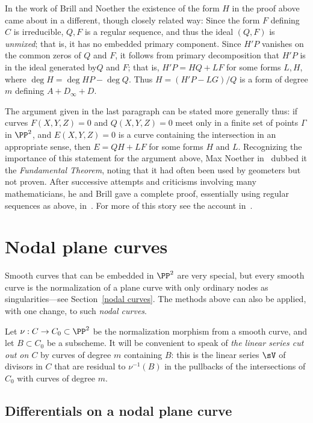 In the work of Brill and Noether the existence of the form $H$ in the proof above came about
in a different, though closely related way: Since the form  $F$ defining $C$ is irreducible, 
$Q,F$ is a regular sequence, and thus the ideal $(Q,F)$ is \emph{unmixed}; that is, it has no embedded primary component.
Since $H'P$ vanishes on the common zeros of $Q$ and $F$, it follows from
primary decomposition that $H'P$ is in the ideal generated by$Q$ and $F$; that is,
$H'P = HQ +LF$ for some
forms $L,H$, where $\deg H = \deg HP - \deg Q$. Thus $H = (H'P- LG)/Q$ is a form
of degree $m$ defining $A+D_\infty+D$.

The argument given in the last paragraph can be stated more generally thus:  if curves $F(X,Y,Z)=0$ and $Q(X,Y,Z)=0$ 
meet only in a finite set of points $\Gamma$ in $\PP^{2}$, and $E(X,Y,Z) = 0$ is a curve containing the intersection in an appropriate sense,
then $E = QH +LF$ for some forms $H$ and $L$. Recognizing the importance of this
statement for the argument above, Max Noether in~\cite{} dubbed it the \emph{Fundamental Theorem}, 
noting that it had often been used by geometers but not proven. After successive attempts and 
criticisms involving many mathematicians, he and Brill gave a complete proof, essentially using
regular sequences as above, in~\cite{****}. For more of this story see the account in~\cite{Eisenbud-Gray}.



\section{Nodal plane curves}\label{nodal curves section}

Smooth curves that can be embedded in $\PP^{2}$ are very special, but every smooth curve 
is the normalization of a plane curve with only ordinary nodes as singularities---see Section~\ref{nodal curves}.  The methods above can also be applied, with one change, to such \emph{nodal curves}.

Let $\nu: C\to C_{0}\subset \PP^{2}$ be the normalization morphism from a smooth curve,
and let $B\subset C_{0}$ be a subscheme.
It will be convenient to speak of \emph{the linear series cut out on $C$} by curves of degree $m$
containing $B$: this is
the linear series  $\sV$ of divisors in $C$ that are residual to $\nu^{-1}(B)$ in the pullbacks 
of the intersections of $C_{0}$ with curves of degree $m$.


\subsection{Differentials on a nodal plane curve}\label{canonical series on nodal plane curves}

